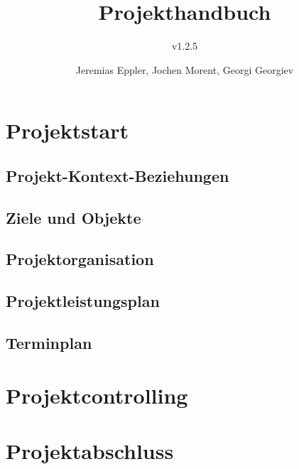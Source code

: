 \documentclass[10pt,a4paper]{scrreprt}
\title{Projekthandbuch}
\subtitle{v1.2.5}
\author{Jeremias Eppler, Jochen Morent, Georgi Georgiev}
\begin{document}
\maketitle
\tableofcontents
\newpage
\chapter{Projektstart}
	\section{Projekt-Kontext-Beziehungen}
		
		\newpage
		
		\newpage
		
	\clearpage
	
	\clearpage
	\section{Ziele und Objekte}
		
	\clearpage
	\section{Projektorganisation}
		
	\clearpage
	\section{Projektleistungsplan}
		
		\newpage
		
	\clearpage
	\section{Terminplan}
		
		\newpage
		
		\newpage
		

\newpage
\chapter{Projektcontrolling}
	
	\clearpage
	
	\clearpage
	

\newpage
\chapter{Projektabschluss}
	
\end{document}
